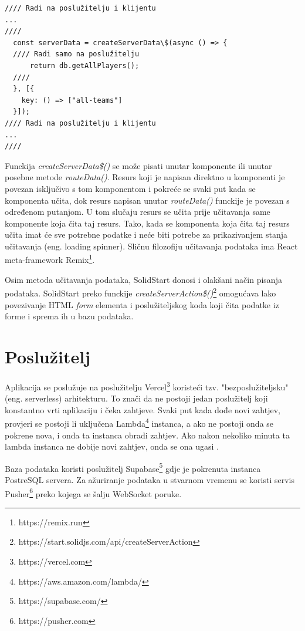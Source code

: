 \documentclass[times, utf8, zavrsni]{fer}
\begin{document}
\begin{lstlisting}[caption=Učitavanje podataka s poslužitelja]
//// Radi na poslužitelju i klijentu
...
////
  const serverData = createServerData\$(async () => {
  //// Radi samo na poslužitelju
      return db.getAllPlayers();
  ////
  }, [{
    key: () => ["all-teams"]
  }]);
//// Radi na poslužitelju i klijentu
...
////
\end{lstlisting}

Funckija \emph{createServerData\$()} se može pisati unutar komponente ili unutar posebne metode \emph{routeData()}.
Resurs koji je napisan direktno u komponenti je povezan isključivo s tom komponentom i pokreće se svaki put kada se komponenta učita, dok resurs napisan unutar \emph{routeData()} funckije je povezan s određenom putanjom.
U tom slučaju resurs se učita prije učitavanja same komponente koja čita taj resurs. Tako, kada se komponenta koja čita taj resurs učita imat će sve potrebne podatke i neće biti potrebe za prikazivanjem stanja učitavanja (eng. loading spinner).
Sličnu filozofiju učitavanja podataka ima React meta-framework Remix\footnote{https://remix.run}.

Osim metoda učitavanja podataka, SolidStart donosi i olakšani način pisanja podataka.
SolidStart preko funckije \emph{createServerAction\$()}\footnote{https://start.solidjs.com/api/createServerAction} omogućava lako povezivanje HTML \emph{form} elementa i poslužiteljskog koda koji čita podatke iz forme i sprema ih u bazu podataka.

\section{Poslužitelj}
Aplikacija se poslužuje na poslužitelju Vercel\footnote{https://vercel.com} koristeći tzv. "bezposlužiteljsku" (eng. serverless) arhitekturu.
To znači da ne postoji jedan poslužitelj koji konstantno vrti aplikaciju i čeka zahtjeve. Svaki put kada dođe novi zahtjev, provjeri se postoji li uključena Lambda\footnote{https://aws.amazon.com/lambda/} instanca, a ako ne postoji onda se pokrene nova, i onda ta instanca obradi zahtjev.
Ako nakon nekoliko minuta ta lambda instanca ne dobije novi zahtjev, onda se ona ugasi \citep{serverless2022}.

Baza podataka koristi poslužitelj Supabase\footnote{https://supabase.com/} gdje je pokrenuta instanca PostreSQL servera.
Za ažuriranje podataka u stvarnom vremenu se koristi servis Pusher\footnote{https://pusher.com} preko kojega se šalju WebSocket poruke.
\end{document}
